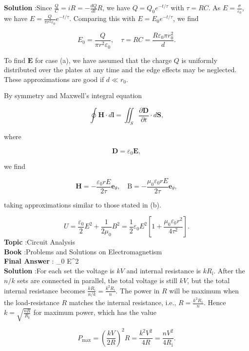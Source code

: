 \documentclass[10pt]{article}
\begin{document}
\textbf{Solution} :Since $\frac{Q}{C}=i R=-\frac{d Q}{d t} R$, we have $Q=Q_{0} e^{-t / \tau}$ with $\tau=R C$. As $E=\frac{\sigma}{\varepsilon_{0}}$, we have $E=\frac{Q}{\pi r^{2} \varepsilon_{0}} e^{-t / \tau}$. Comparing this with $E=E_{0} e^{-t / \tau}$, we find

$$
E_{0}=\frac{Q}{\pi r^{2} \varepsilon_{0}}, \quad \tau=R C=\frac{R \varepsilon_{0} \pi r_{0}^{2}}{d} .
$$

 To find $\mathbf{E}$ for case (a), we have assumed that the charge $Q$ is uniformly distributed over the plates at any time and the edge effects may be neglected. These approximations are good if $d \ll r_{0}$.

 By symmetry and Maxwell's integral equation

$$
\oint \mathbf{H} \cdot d \mathbf{l}=\iint_{S} \frac{\partial \mathbf{D}}{\partial t} \cdot d \mathbf{S},
$$

where

$$
\mathbf{D}=\varepsilon_{0} \mathbf{E},
$$

we find

$$
\mathbf{H}=-\frac{\varepsilon_{0} r E}{2 \tau} \mathbf{e}_{\theta}, \quad \mathrm{B}=-\frac{\mu_{0} \varepsilon_{0} r E}{2 \tau} \mathbf{e}_{\theta},
$$

taking approximations similar to those stated in (b).



$$
U=\frac{\varepsilon_{0}}{2} E^{2}+\frac{1}{2 \mu_{0}} B^{2}=\frac{1}{2} \varepsilon_{0} E^{2}\left[1+\frac{\mu_{0} \varepsilon_{0} r^{2}}{4 \tau^{2}}\right] .
$$
\textbf{Topic} :Circuit Analysis\\
\textbf{Book} :Problems and Solutions on Electromagnetism\\
\textbf{Final Answer} : \varepsilon_{0} E^{2}\\


\textbf{Solution} :For each set the voltage is $k V$ and internal resistance is $k R_{\mathrm{i}}$. After the $n / k$ sets are connected in parallel, the total voltage is still $k V$, but the total internal resistance becomes $\frac{k R_{i}}{n / k}=\frac{k^{2} R_{i}}{n}$. The power in $R$ will be maximum when the load-resistance $R$ matches the internal resistance, i.e., $R=\frac{k^{2} R_{1}}{n}$. Hence $k=\sqrt{\frac{n R}{R_{\mathbf{i}}}}$ for maximum power, which has the value

$$
P_{\max }=\left(\frac{k V}{2 R}\right)^{2} R=\frac{k^{2} V^{2}}{4 R}=\frac{n V^{2}}{4 R_{\mathrm{i}}} .
$$
\end{document}

